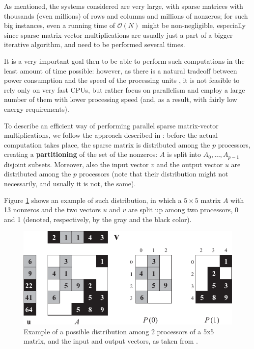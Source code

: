 As mentioned, the systems considered are very large, with sparse matrices with thousands (even millions) of rows and columns and millions of nonzeros; for such big instances, even a running time of $\mathcal{O}(N)$ might be non-negligible, especially since sparse matrix-vector multiplications are usually just a part of a bigger iterative algorithm, and need to be performed several times.

It is a very important goal then to be able to perform such computations in the least amount of time possible: however, as there is a natural tradeoff between power consumption and the speed of the processing units \cite{rabaey1996digital}, it is not feasible to rely only on very fast CPUs, but rather focus on parallelism and employ a large number of them with lower processing speed (and, as a result, with fairly low energy requirements).

To describe an efficient way of performing parallel sparse matrix-vector multiplications, we follow the approach described in \cite{BSP}: before the actual computation takes place, the sparse matrix is distributed among the $p$ processors, creating a \textbf{partitioning} of the set of the nonzeros: $A$ is split into $A_0,\dots,A_{p-1}$ disjoint subsets. Moreover, also the input vector $v$ and the output vector $u$ are distributed among the $p$ processors (note that their distribution might not necessarily, and usually it is not, the same).

Figure \ref{fig:partition} shows an example of such distribution, in which a $5 \times 5$ matrix $A$ with 13 nonzeros and the two vectors $u$ and $v$ are split up among two processors, 0 and 1 (denoted, respectively, by the gray and the black color).

\begin{figure}[h]
	\centering
	\includegraphics{img/partition}
	\caption{Example of a possible distribution among 2 processors of a 5x5 matrix, and the input and output vectors, as taken from \cite[Fig. 4.3]{BSP}.}
	\label{fig:partition}
\end{figure}

